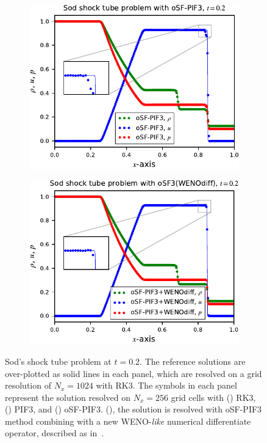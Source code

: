 \begin{figure}
\begin{subfigure}{0.49\textwidth}
        \includegraphics[width=\textwidth]{fig/sod_osf3}
        \caption{}\label{subfig:sod_osf3}
    \end{subfigure}
    \begin{subfigure}{0.49\textwidth}
        \centering
        \includegraphics[width=\textwidth]{fig/sod_osf3_wenodiff}
        \caption{}\label{subfig:sod_osf3_wenodiff}
    \end{subfigure}
    \caption{Sod's shock tube problem at \( t = 0.2 \).
        The reference solutions are over-plotted
        as solid lines in each panel, which are resolved on a grid resolution of \( N_{x} = 1024 \)
        with RK3. The symbols in each panel represent the solution resolved on
        \( N_{x} = 256 \) grid cells with
        (\protect{}) RK3,
        (\protect{}) PIF3, and (\protect{}) oSF-PIF3\@.
        (\protect{}), the solution is resolved
        with oSF-PIF3 method combining with a new WENO-\textit{like} numerical differentiate operator,
        described as in~.
    }\label{fig:sod_third}
\end{figure}

